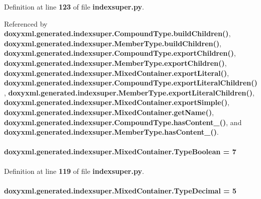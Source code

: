 Definition at line {\bf 123} of file {\bf indexsuper.\+py}.



Referenced by {\bf doxyxml.\+generated.\+indexsuper.\+Compound\+Type.\+build\+Children()}, {\bf doxyxml.\+generated.\+indexsuper.\+Member\+Type.\+build\+Children()}, {\bf doxyxml.\+generated.\+indexsuper.\+Compound\+Type.\+export\+Children()}, {\bf doxyxml.\+generated.\+indexsuper.\+Member\+Type.\+export\+Children()}, {\bf doxyxml.\+generated.\+indexsuper.\+Mixed\+Container.\+export\+Literal()}, {\bf doxyxml.\+generated.\+indexsuper.\+Compound\+Type.\+export\+Literal\+Children()}, {\bf doxyxml.\+generated.\+indexsuper.\+Member\+Type.\+export\+Literal\+Children()}, {\bf doxyxml.\+generated.\+indexsuper.\+Mixed\+Container.\+export\+Simple()}, {\bf doxyxml.\+generated.\+indexsuper.\+Mixed\+Container.\+get\+Name()}, {\bf doxyxml.\+generated.\+indexsuper.\+Compound\+Type.\+has\+Content\+\_\+()}, and {\bf doxyxml.\+generated.\+indexsuper.\+Member\+Type.\+has\+Content\+\_\+()}.

\paragraph[{Type\+Boolean}]{ doxyxml.\+generated.\+indexsuper.\+Mixed\+Container.\+Type\+Boolean = 7\hspace{0.3cm}{\ttfamily [static]}}\label{classdoxyxml_1_1generated_1_1indexsuper_1_1MixedContainer_a29dfc3984aa8aac5696f43634a97095c}


Definition at line {\bf 119} of file {\bf indexsuper.\+py}.

\paragraph[{Type\+Decimal}]{ doxyxml.\+generated.\+indexsuper.\+Mixed\+Container.\+Type\+Decimal = 5\hspace{0.3cm}{\ttfamily [static]}}\label{classdoxyxml_1_1generated_1_1indexsuper_1_1MixedContainer_a95f3ddff3ee207a353c3580c05975020}


